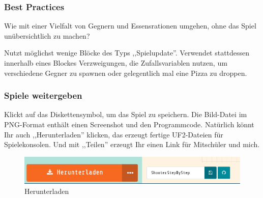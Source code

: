 \documentclass{beamer}
\begin{document}
 \begin{frame}
 \frametitle{Best Practices}

Wie mit einer Vielfalt von Gegnern und Essensrationen umgehen, ohne das Spiel unübersichtlich zu machen?

Nutzt möglichst wenige Blöcke des Typs ,,Spielupdate''. Verwendet stattdessen innerhalb eines Blockes Verzweigungen, die Zufallsvariablen nutzen, um verschiedene Gegner zu spawnen oder gelegentlich mal eine Pizza zu droppen.


\end{frame}


 \begin{frame}
 \frametitle{Spiele weitergeben}
Klickt auf das Diskettensymbol, um das Spiel zu speichern. Die Bild-Datei im PNG-Format enthält einen Screenshot und den Programmcode. Natürlich könnt Ihr auch ,,Herunterladen'' klicken, das erzeugt fertige UF2-Dateien für Spielekonsolen. Und mit ,,Teilen'' erzeugt Ihr einen Link für Mitschüler und mich. 
 
 \begin{figure}
  \includegraphics[width=13cm]{game18.png}
  \caption{Herunterladen}
  \label{fig:game4}
\end{figure}
\end{frame}
\end{document}
